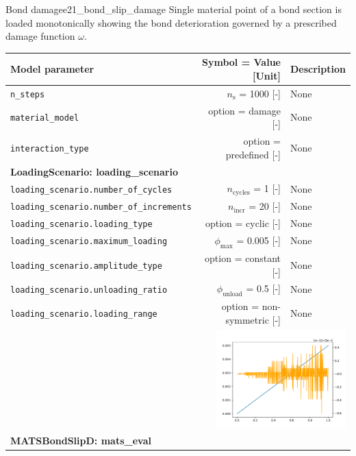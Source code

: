 \documentclass[main.tex]{subfiles}
\begin{document}
\begin{bmcsex}{Bond damage}{e21_bond_slip_damage}
\noindent Single material point of a bond section is
    loaded monotonically showing the bond deterioration
    governed by a prescribed damage function $\omega$.
     \\
\begin{center}
            
{\scriptsize 
\begin{longtable}{lrp{4cm}}\toprule
\textbf{\textsf{Model parameter}} 
& 
\textbf{\textsf{Symbol = Value [Unit]}} 
&
\textbf{\textsf{Description}}  \\\midrule \midrule
\texttt{n\_steps} & $n_\mathrm{s}$ = 1000 [-] & {\footnotesize None}  \\
            \texttt{material\_model} & option = damage [-] & {\footnotesize None}  \\
            \texttt{interaction\_type} & option = predefined [-] & {\footnotesize None}  \\
            \midrule
\multicolumn{3}{l}{\textbf{\textsf{LoadingScenario: loading\_scenario}}}\\

\texttt{loading\_scenario.number\_of\_cycles} & $n_\mathrm{cycles}$ = 1 [-] & {\footnotesize None}  \\
            \texttt{loading\_scenario.number\_of\_increments} & $n_{\mathrm{incr}}$ = 20 [-] & {\footnotesize None}  \\
            \texttt{loading\_scenario.loading\_type} & option = cyclic [-] & {\footnotesize None}  \\
            \texttt{loading\_scenario.maximum\_loading} & $\phi_{\max}$ = 0.005 [-] & {\footnotesize None}  \\
            \texttt{loading\_scenario.amplitude\_type} & option = constant [-] & {\footnotesize None}  \\
            \texttt{loading\_scenario.unloading\_ratio} & $\phi_{\mathrm{unload}}$ = 0.5 [-] & {\footnotesize None}  \\
            \texttt{loading\_scenario.loading\_range} & option = non-symmetric [-] & {\footnotesize None}  \\
            
\multicolumn{3}{r}{\includegraphics[width=5cm]{examples/e21_bond_slip_damage/fig_loading_scenario.pdf}}\\
\midrule
\multicolumn{3}{l}{\textbf{\textsf{MATSBondSlipD: mats\_eval}}}\\


\end{longtable}}
\end{center}
\end{bmcsex}
\end{document}
